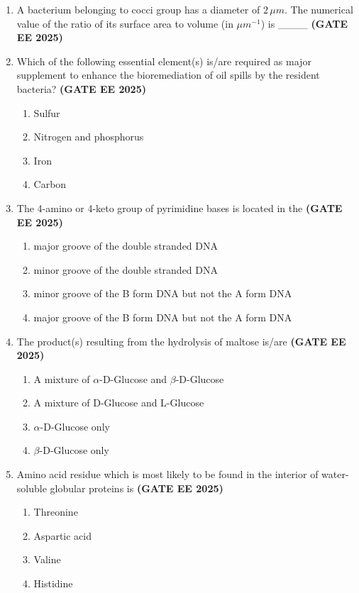 \documentclass[journal,12pt,onecolumn]{IEEEtran}
\theoremstyle{remark}
\begin{document}
\begin{enumerate}
\item A bacterium belonging to cocci group has a diameter of $2 \, \mu m$. The numerical value of the ratio of its surface area to volume (in $\mu m^{-1}$) is \_\_\_\_
\hfill \textbf{(GATE EE 2025)}

\item Which of the following essential element(s) is/are required as major supplement to enhance the bioremediation of oil spills by the resident bacteria? \hfill \textbf{(GATE EE 2025)} 
\begin{enumerate} 
\item Sulfur
\item Nitrogen and phosphorus
\item Iron
\item Carbon
\end{enumerate}

\item The 4-amino or 4-keto group of pyrimidine bases is located in the   \hfill \textbf{(GATE EE 2025)}
\begin{enumerate} 
\item major groove of the double stranded DNA
\item minor groove of the double stranded DNA
\item minor groove of the B form DNA but not the A form DNA
\item major groove of the B form DNA but not the A form DNA
\end{enumerate}

\item The product(s) resulting from the hydrolysis of maltose is/are   \hfill \textbf{(GATE EE 2025)}
\begin{enumerate} 
\item A mixture of $\alpha$-D-Glucose and $\beta$-D-Glucose
\item A mixture of D-Glucose and L-Glucose
\item $\alpha$-D-Glucose only
\item $\beta$-D-Glucose only
\end{enumerate}

\item Amino acid residue which is most likely to be found in the interior of water-soluble globular proteins is  \hfill \textbf{(GATE EE 2025)}
\begin{enumerate}
\item Threonine
\item Aspartic acid
\item Valine
\item Histidine
\end{enumerate}


\end{enumerate}
\end{document}
